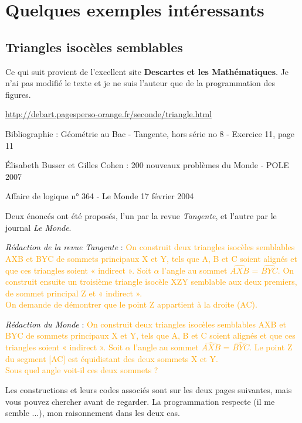 

\section{Quelques exemples intéressants}

\subsection{Triangles isocèles semblables}

Ce qui suit provient de l'excellent site \textbf{Descartes et les Mathématiques}. Je n'ai pas modifié le texte  et je ne suis l'auteur que de la programmation des figures.

\url{http://debart.pagesperso-orange.fr/seconde/triangle.html}

Bibliographie : Géométrie au Bac - Tangente, hors série no 8 - Exercice 11, page 11

Élisabeth Busser et Gilles Cohen : 200 nouveaux problèmes du Monde - POLE 2007

Affaire de logique n° 364 - Le Monde 17 février 2004


Deux énoncés ont été proposés, l'un par la revue \emph{Tangente}, et l'autre par le journal \emph{Le Monde}.

\vspace*{2cm}
\emph{Rédaction de la revue Tangente} : \textcolor{orange}{On construit deux triangles isocèles semblables AXB et BYC de sommets principaux X et Y, tels que A, B et C soient alignés et que ces triangles soient « indirect ». Soit $\alpha$ l'angle au sommet $\widehat{AXB}$ = $\widehat{BYC}$. On construit ensuite un troisième triangle isocèle XZY semblable aux deux premiers, de sommet principal Z et « indirect ».\\
On demande de démontrer que le point Z appartient à la droite (AC).}

\vspace*{2cm}
\emph{Rédaction du Monde} : \textcolor{orange}{On construit deux triangles isocèles semblables AXB et BYC de sommets principaux X et Y, tels que A, B et C soient alignés et que ces triangles soient « indirect ». Soit $\alpha$ l'angle au sommet $\widehat{AXB}$ = $\widehat{BYC}$. Le point Z du segment [AC] est équidistant des deux sommets X et Y.\\
Sous quel angle voit-il ces deux sommets ?}

\vspace*{2cm}  Les constructions et leurs codes associés sont sur les deux pages suivantes, mais vous pouvez chercher avant de regarder. La programmation respecte (il me semble ...), mon raisonnement dans les deux cas.
\newpage  

